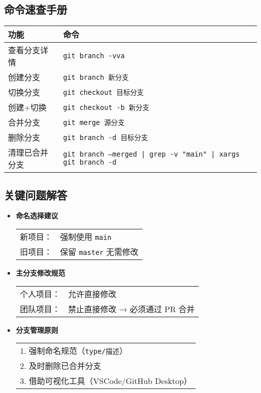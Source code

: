 \subsection{命令速查手册}
\begin{center}
\begin{tabular}{ll}
    \toprule
    \textbf{功能} & \textbf{命令} \\
    \midrule
    查看分支详情 & \texttt{git branch -vva} \\
    创建分支 & \texttt{git branch 新分支} \\
    切换分支 & \texttt{git checkout 目标分支} \\
    创建+切换 & \texttt{git checkout -b 新分支} \\
    合并分支 & \texttt{git merge 源分支} \\
    删除分支 & \texttt{git branch -d 目标分支} \\
    清理已合并分支 & \texttt{git branch --merged | grep -v "main" | xargs git branch -d} \\
    \bottomrule
\end{tabular}
\end{center}

\subsection{关键问题解答}
\begin{itemize}[leftmargin=*, nosep]
    \item \textbf{命名选择建议} \\
    \begin{tabular}{@{}ll@{}}
        新项目： & 强制使用 \texttt{main} \\
        旧项目： & 保留 \texttt{master} 无需修改 \\
    \end{tabular}
    
    \item \textbf{主分支修改规范} \\
    
\begin{tabular}{@{}ll@{}}
        个人项目： & 允许直接修改 \\
        团队项目： & 禁止直接修改 → 必须通过 PR 合并 \\
    \end{tabular}
    
    \item \textbf{分支管理原则} \\
    
\begin{tabular}{@{}l@{}}
        1. 强制命名规范（\texttt{type/描述}） \\
        2. 及时删除已合并分支 \\
        3. 借助可视化工具（VSCode/GitHub Desktop） \\
    \end{tabular}
\end{itemize}

